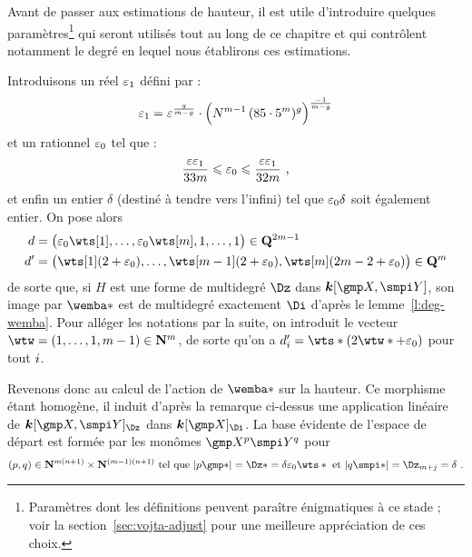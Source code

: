 Avant de passer aux estimations de hauteur, il est utile d'introduire quelques
paramètres\footnote{Paramètres dont les définitions peuvent paraître
  énigmatiques à ce stade ; voir la section~\vref{sec:vojta-adjust} pour une
  meilleure appréciation de ces choix.} qui seront utilisés tout au long de ce
chapitre et qui contrôlent notamment le degré en lequel nous établirons ces
estimations.

Introduisons un réel \( \varepsilon\sb1 \) défini par :
\begin{equation} \label{e:def-epsi}
  \varepsilon\sb1
  =
  \varepsilon^{\frac{g}{m-g}}
  \cdot \Bigl(
    N^{m-1}
    \, (85 \cdot 5^m)^g
  \Bigr)^{\frac{-1}{m-g}}
\end{equation}
et un rationnel \( \varepsilon\sb0 \) tel que :
\begin{equation} \label{e:def-epsz}
  \frac{\varepsilon \varepsilon\sb1}{33m}
  \leqslant \varepsilon\sb0 \leqslant
  \frac{\varepsilon \varepsilon\sb1}{32m}
  \text{ ,}
\end{equation}
et enfin un entier \( \delta \) (destiné à tendre vers l'infini) tel que \(
  \varepsilon\sb0 \delta \) soit également entier. On pose alors
\begin{equation} \label{e:d-dp-def}
  \begin{aligned}
    d & = \bigl(
      \epsz \wts[1],
      \dots,
      \epsz \wts[\puiss],
      1, \dots, 1
    \bigr) \in \Q^{2\puiss-1}
    \\
    d' & = \bigl(
      \wts[1] (2 + \epsz),
      \dots,
      \wts[\puiss-1] (2 + \epsz),
      \wts[\puiss] (2\puiss - 2 + \epsz)
    \bigr) \in \Q^\puiss
  \end{aligned}
\end{equation}
de sorte que, si \( H \) est une forme de multidegré \( \Dz \) dans \(
  \cdn[\vmp, \vmpi] \), son image par \( \wemba* \) est de multidegré
exactement \( \Di \) d'après le lemme~\vref{l:deg-wemba}. Pour alléger les
notations par la suite, on introduit le vecteur \( \wtw = (1, \dots, 1, \puiss
  - 1) \in \N^\puiss \), de sorte qu'on a \( d'_\fct = \wts* (2 \wtw* + \epsz)
\) pour tout \( i \).

\medskip

Revenons donc au calcul de l'action de \( \wemba* \) sur la hauteur. Ce
morphisme étant homogène, il induit d'après la remarque ci-dessus une
application linéaire de \( \cdn [\vmp, \vmpi]_\Dz \) dans \( \cdn [\vmp]_\Di
\).  La base évidente de l'espace de départ est formée par les monômes \(
  \vmp^p \vmpi^q \) pour
\begin{equation}
  (p, q)
  \in \N^{\puiss (\dimp+1)} \times \N^{(\puiss-1) (\dimp+1)}
  \text{ tel que }
  \lgr{p\mexp*} = \Dz* = \delta \epsz \wts*
  \text{ et }
  \lgr{q\mexpi*} = \Dz_{\puiss + \fcti} = \delta
  \pmm.
\end{equation}

